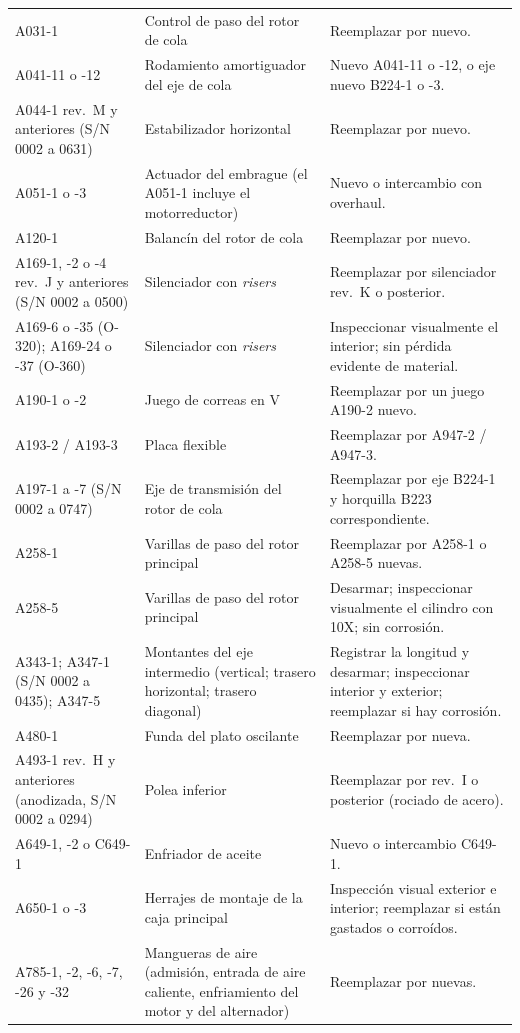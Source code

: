 {\begin{longtable}{@{}p{2.1cm}p{2.6cm}p{\dimexpr\linewidth-4.7cm-4\tabcolsep}@{}}
A031-1 & Control de paso del rotor de cola & Reemplazar por nuevo. \\
A041-11 o -12 & Rodamiento amortiguador del eje de cola & Nuevo A041-11 o -12, o eje nuevo B224-1 o -3. \\
A044-1 rev.~M y anteriores (S/N 0002 a 0631) & Estabilizador horizontal & Reemplazar por nuevo. \\
A051-1 o -3 & Actuador del embrague (el A051-1 incluye el motorreductor) & Nuevo o intercambio con overhaul. \\
A120-1 & Balancín del rotor de cola & Reemplazar por nuevo. \\
A169-1, -2 o -4 rev.~J y anteriores (S/N 0002 a 0500) & Silenciador con \emph{risers} & Reemplazar por silenciador rev.~K o posterior. \\
A169-6 o -35 (O-320); A169-24 o -37 (O-360) & Silenciador con \emph{risers} & Inspeccionar visualmente el interior; sin pérdida evidente de material. \\
A190-1 o -2 & Juego de correas en V & Reemplazar por un juego A190-2 nuevo. \\
A193-2 / A193-3 & Placa flexible & Reemplazar por A947-2 / A947-3. \\
A197-1 a -7 (S/N 0002 a 0747) & Eje de transmisión del rotor de cola & Reemplazar por eje B224-1 y horquilla B223 correspondiente. \\
A258-1 & Varillas de paso del rotor principal & Reemplazar por A258-1 o A258-5 nuevas. \\
A258-5 & Varillas de paso del rotor principal & Desarmar; inspeccionar visualmente el cilindro con 10X; sin corrosión. \\
A343-1; A347-1 (S/N 0002 a 0435); A347-5 & Montantes del eje intermedio (vertical; trasero horizontal; trasero diagonal) & Registrar la longitud y desarmar; inspeccionar interior y exterior; reemplazar si hay corrosión. \\
A480-1 & Funda del plato oscilante & Reemplazar por nueva. \\
A493-1 rev.~H y anteriores (anodizada, S/N 0002 a 0294) & Polea inferior & Reemplazar por rev.~I o posterior (rociado de acero). \\
A649-1, -2 o C649-1 & Enfriador de aceite & Nuevo o intercambio C649-1. \\
A650-1 o -3 & Herrajes de montaje de la caja principal & Inspección visual exterior e interior; reemplazar si están gastados o corroídos. \\
A785-1, -2, -6, -7, -26 y -32 & Mangueras de aire (admisión, entrada de aire caliente, enfriamiento del motor y del alternador) & Reemplazar por nuevas. \\

\end{longtable}}
